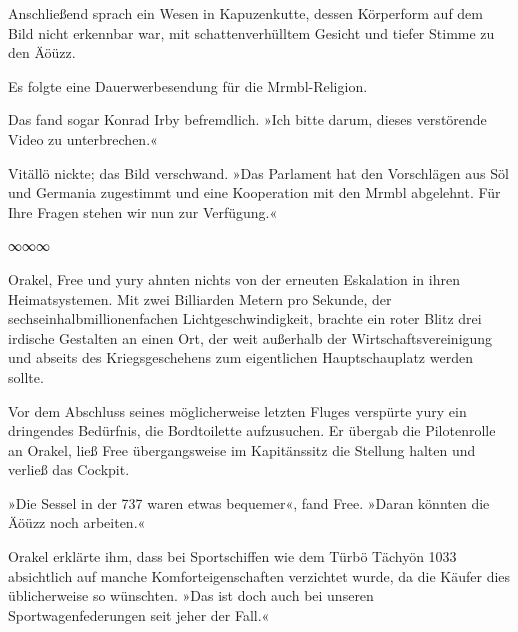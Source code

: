 
Anschließend sprach ein Wesen in Kapuzenkutte, dessen Körperform auf dem Bild nicht erkennbar war, mit schattenverhülltem Gesicht und tiefer Stimme zu den Äöüzz.

 Es folgte eine Dauerwerbesendung für die Mrmbl-Religion.

Das fand sogar Konrad Irby befremdlich. »Ich bitte darum, dieses verstörende Video zu unterbrechen.«

Vitällö nickte; das Bild verschwand. »Das Parlament hat den Vorschlägen aus Söl und Germania zugestimmt und eine Kooperation mit den Mrmbl abgelehnt. Für Ihre Fragen stehen wir nun zur Verfügung.«

\begin{center}
∞∞∞
\end{center}

Orakel, Free und yury ahnten nichts von der erneuten Eskalation in ihren Heimatsystemen. Mit zwei Billiarden Metern pro Sekunde, der sechseinhalbmillionenfachen Lichtgeschwindigkeit, brachte ein roter Blitz drei irdische Gestalten an einen Ort, der weit außerhalb der Wirtschaftsvereinigung und abseits des Kriegsgeschehens zum eigentlichen Hauptschauplatz werden sollte.

Vor dem Abschluss seines möglicherweise letzten Fluges verspürte yury ein dringendes Bedürfnis, die Bordtoilette aufzusuchen. Er übergab die Pilotenrolle an Orakel, ließ Free übergangsweise im Kapitänssitz die Stellung halten und verließ das Cockpit.

»Die Sessel in der 737 waren etwas bequemer«, fand Free. »Daran könnten die Äöüzz noch arbeiten.«

Orakel erklärte ihm, dass bei Sportschiffen wie dem Türbö Tächyön 1033 absichtlich auf manche Komforteigenschaften verzichtet wurde, da die Käufer dies üblicherweise so wünschten. »Das ist doch auch bei unseren Sportwagenfederungen seit jeher der Fall.«

